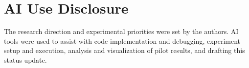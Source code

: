 
\section{AI Use Disclosure}
\label{app:ai-disclosure}

The research direction and experimental priorities were set by the authors. AI tools were used to assist with code implementation and debugging, experiment setup and execution, analysis and visualization of pilot results, and drafting this status update.

